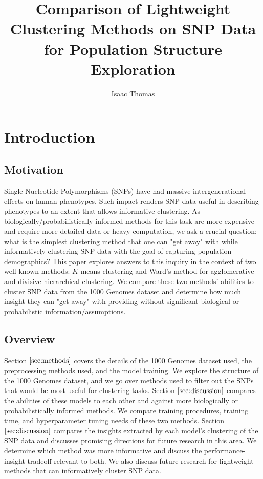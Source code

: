 \documentclass[letterpaper]{article}
\title{Comparison of Lightweight Clustering Methods on SNP Data for Population Structure Exploration}
\author{Isaac Thomas}
\theoremstyle{definition}
\begin{document}
\maketitle

\section{Introduction}\label{sec:intro}
\subsection{Motivation}
\noindent Single Nucleotide Polymorphisms (SNPs) have had massive intergenerational effects on human phenotypes. Such impact renders SNP data useful in describing phenotypes to an extent that allows informative clustering. As biologically/probabilistically informed methods for this task are more expensive and require more detailed data or heavy computation, we ask a crucial question: what is the simplest clustering method that one can "get away" with while informatively clustering SNP data with the goal of capturing population demographics? This paper explores answers to this inquiry in the context of two well-known methods: $K$-means clustering and Ward's method for agglomerative and divisive hierarchical clustering. We compare these two methods' abilities to cluster SNP data from the 1000 Genomes dataset and determine how much insight they can "get away" with providing without significant biological or probabilistic information/assumptions.
\subsection{Overview}
Section $\ref{sec:methods}$ covers the details of the 1000 Genomes dataset used, the preprocessing methods used, and the model training. We explore the structure of the 1000 Genomes dataset, and we go over methods used to filter out the SNPs that would be most useful for clustering tasks. Section $\ref{sec:discussion}$ compares the abilities of these models to each other and against more biologically or probabilistically informed methods. We compare training procedures, training time, and hyperparameter tuning needs of these two methods. Section $\ref{sec:discussion}$ compares the insights extracted by each model's clustering of the SNP data and discusses promising directions for future research in this area. We determine which method was more informative and discuss the performance-insight tradeoff relevant to both. We also discuss future research for lightweight methods that can informatively cluster SNP data.
\end{document}
